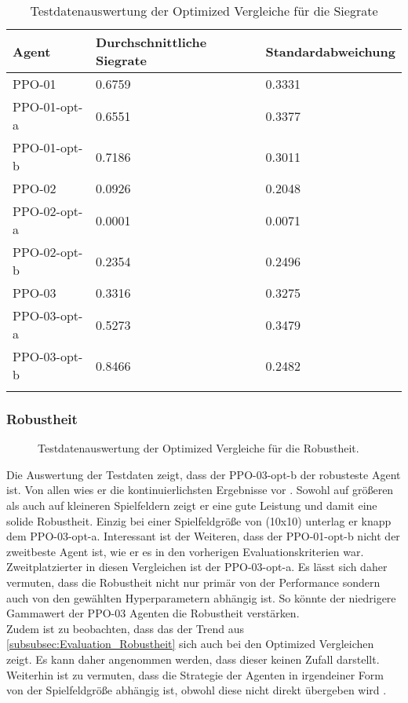 \begin{longtable}[h]{|p{4.5cm}|p{4.5cm}|p{4.5cm}|}
	\hline
	Agent & Durchschnittliche Siegrate & Standardabweichung \\
	\hline
	PPO-01 & 0.6759 & 0.3331 \\ 
	\hline
	PPO-01-opt-a & 0.6551 & 0.3377 \\ 
	\hline
	PPO-01-opt-b & 0.7186 & 0.3011 \\ 
	\hline
	PPO-02 & 0.0926 & 0.2048 \\ 
	\hline
	PPO-02-opt-a & 0.0001 & 0.0071 \\ 
	\hline
	PPO-02-opt-b & 0.2354 & 0.2496 \\ 
	\hline
	PPO-03 & 0.3316 & 0.3275 \\ 
	\hline
	PPO-03-opt-a & 0.5273 & 0.3479 \\ 
	\hline
	PPO-03-opt-b & 0.8466 & 0.2482 \\ 
	\hline
	\caption{Testdatenauswertung der Optimized Vergleiche für die Siegrate}
	\label{tab:Evaluation_Testdaten_Winrate_Optimized} 
\end{longtable}

\subsubsection{Robustheit}
\begin{figure}[H]
	\centering
	
	\caption[Robustheit - Auswertung der Testdaten der Optimized Vergleiche]{Testdatenauswertung der Optimized Vergleiche für die Robustheit.}
	\label{fig:Evaluation_Robustheit_Optimized}
\end{figure}
Die Auswertung der Testdaten zeigt, dass der PPO-03-opt-b der robusteste Agent ist.
Von allen wies er die kontinuierlichsten Ergebnisse vor . Sowohl auf größeren als auch auf kleineren Spielfeldern zeigt er eine gute Leistung und damit eine solide Robustheit. 
Einzig bei einer Spielfeldgröße von (10x10) unterlag er knapp dem PPO-03-opt-a.
Interessant ist der Weiteren, dass der PPO-01-opt-b nicht der zweitbeste Agent ist, wie er es in den vorherigen Evaluationskriterien war. Zweitplatzierter in diesen Vergleichen ist der PPO-03-opt-a. Es lässt sich daher vermuten, dass die Robustheit nicht nur primär von der Performance sondern auch von den gewählten Hyperparametern abhängig ist. So könnte der niedrigere Gammawert der PPO-03 Agenten die Robustheit verstärken.\\
Zudem ist zu beobachten, dass das der Trend aus \autoref{subsubsec:Evaluation_Robustheit} sich auch bei den Optimized Vergleichen zeigt. Es kann daher angenommen werden, dass dieser keinen Zufall darstellt.
\newpage
Weiterhin ist zu vermuten, dass die Strategie der Agenten in irgendeiner Form von der Spielfeldgröße abhängig ist, obwohl diese nicht direkt übergeben wird .

